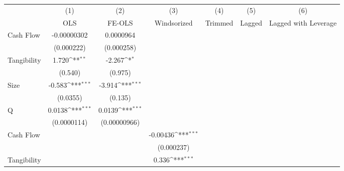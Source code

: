 {
\def\sym#1{\ifmmode^{#1}\else\(^{#1}\)\fi}
\begin{tabular}{l*{6}{c}}
\hline\hline
                    &\multicolumn{1}{c}{(1)}         &\multicolumn{1}{c}{(2)}         &\multicolumn{1}{c}{(3)}         &\multicolumn{1}{c}{(4)}         &\multicolumn{1}{c}{(5)}         &\multicolumn{1}{c}{(6)}         \\
                    &         OLS         &      FE-OLS         & Windsorized         &     Trimmed         &     Lagged          &Lagged with Leverage         \\
\hline
Cash Flow           & -0.00000302         &   0.0000964         &                     &                     &                     &                     \\
                    &  (0.000222)         &  (0.000258)         &                     &                     &                     &                     \\
[1em]
Tangibility         &       1.720\sym{**} &      -2.267\sym{*}  &                     &                     &                     &                     \\
                    &     (0.540)         &     (0.975)         &                     &                     &                     &                     \\
[1em]
Size                &      -0.583\sym{***}&      -3.914\sym{***}&                     &                     &                     &                     \\
                    &    (0.0355)         &     (0.135)         &                     &                     &                     &                     \\
[1em]
Q                   &      0.0138\sym{***}&      0.0139\sym{***}&                     &                     &                     &                     \\
                    & (0.0000114)         &(0.00000966)         &                     &                     &                     &                     \\
[1em]
Cash Flow           &                     &                     &    -0.00436\sym{***}&                     &                     &                     \\
                    &                     &                     &  (0.000237)         &                     &                     &                     \\
[1em]
Tangibility         &                     &                     &       0.336\sym{***}&                     &                     &                     \\

\end{tabular}}
